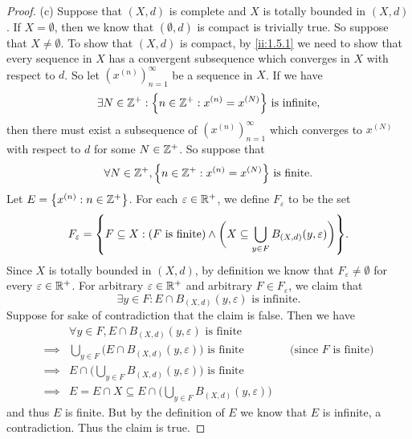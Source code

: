 \begin{proof}{(c)}
  Suppose that \((X, d)\) is complete and \(X\) is totally bounded in \((X, d)\).
  If \(X = \emptyset\), then we know that \((\emptyset, d)\) is compact is trivially true.
  So suppose that \(X \neq \emptyset\).
  To show that \((X, d)\) is compact, by \cref{ii:1.5.1} we need to show that every sequence in \(X\) has a convergent subsequence which converges in \(X\) with respect to \(d\).
  So let \((x^{(n)})_{n = 1}^\infty\) be a sequence in \(X\).
  If we have
  \[
    \exists N \in \Z^+ : \set{n \in \Z^+ : x^{(n)} = x^{(N)}} \text{ is infinite},
  \]
  then there must exist a subsequence of \((x^{(n)})_{n = 1}^\infty\) which converges to \(x^{(N)}\) with respect to \(d\) for some \(N \in \mathbb{Z}^+\).
  So suppose that
  \[
    \forall N \in \Z^+, \set{n \in \Z^+ : x^{(n)} = x^{(N)}} \text{ is finite}.
  \]
  Let \(E = \left\lbrace x^{(n)} : n \in \mathbb{Z}^+\right\rbrace\).
  For each \(\varepsilon \in \mathbb{R}^+\), we define \(F_\varepsilon\) to be the set
  \[
    F_\varepsilon = \set{F \subseteq X : (F \text{ is finite}) \land \bigg(X \subseteq \bigcup_{y \in F} B_{(X, d)}(y, \varepsilon)\bigg)}.
  \]
  Since \(X\) is totally bounded in \((X, d)\), by definition we know that \(F_\varepsilon \neq \emptyset\) for every \(\varepsilon \in \mathbb{R}^+\).
  For arbitrary \(\varepsilon \in \mathbb{R}^+\) and arbitrary \(F \in F_\varepsilon\), we claim that
  \[
    \exists y \in F : E \cap B_{(X, d)}(y, \varepsilon) \text{ is infinite}.
  \]
  Suppose for sake of contradiction that the claim is false.
  Then we have
  \begin{align*}
             & \forall y \in F, E \cap B_{(X, d)}(y, \varepsilon) \text{ is finite}                                                       \\
    \implies & \bigcup_{y \in F} \bigg(E \cap B_{(X, d)}(y, \varepsilon)\bigg) \text{ is finite}      &  & \text{(since \(F\) is finite)} \\
    \implies & E \cap \bigg(\bigcup_{y \in F} B_{(X, d)}(y, \varepsilon)\bigg) \text{ is finite}                                          \\
    \implies & E = E \cap X \subseteq E \cap \bigg(\bigcup_{y \in F} B_{(X, d)}(y, \varepsilon)\bigg)
  \end{align*}
  and thus \(E\) is finite.
  But by the definition of \(E\) we know that \(E\) is infinite, a contradiction.
  Thus the claim is true.


\end{proof}
